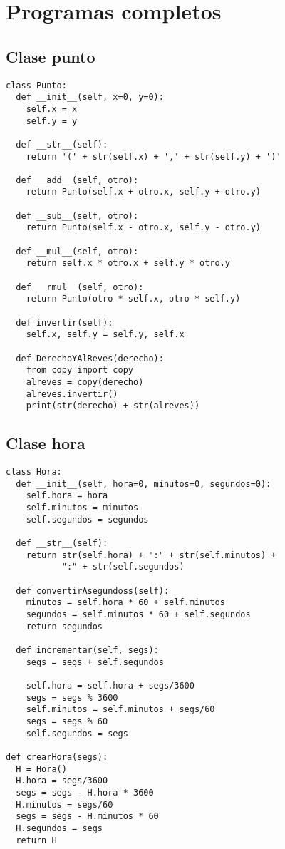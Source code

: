 
\chapter{Programas completos}

\section{Clase punto}

\begin{verbatim}
class Punto:
  def __init__(self, x=0, y=0):
    self.x = x
    self.y = y

  def __str__(self):
    return '(' + str(self.x) + ',' + str(self.y) + ')'

  def __add__(self, otro):
    return Punto(self.x + otro.x, self.y + otro.y)

  def __sub__(self, otro):
    return Punto(self.x - otro.x, self.y - otro.y)

  def __mul__(self, otro):
    return self.x * otro.x + self.y * otro.y

  def __rmul__(self, otro):
    return Punto(otro * self.x, otro * self.y)

  def invertir(self):
    self.x, self.y = self.y, self.x

  def DerechoYAlReves(derecho):
    from copy import copy
    alreves = copy(derecho)
    alreves.invertir()
    print(str(derecho) + str(alreves))
\end{verbatim}

\section{Clase hora}

\begin{verbatim}
class Hora:
  def __init__(self, hora=0, minutos=0, segundos=0):
    self.hora = hora
    self.minutos = minutos
    self.segundos = segundos

  def __str__(self):
    return str(self.hora) + ":" + str(self.minutos) + 
           ":" + str(self.segundos)

  def convertirAsegundoss(self):
    minutos = self.hora * 60 + self.minutos
    segundos = self.minutos * 60 + self.segundos
    return segundos

  def incrementar(self, segs):
    segs = segs + self.segundos

    self.hora = self.hora + segs/3600
    segs = segs % 3600
    self.minutos = self.minutos + segs/60
    segs = segs % 60
    self.segundos = segs

def crearHora(segs):
  H = Hora()
  H.hora = segs/3600
  segs = segs - H.hora * 3600
  H.minutos = segs/60
  segs = segs - H.minutos * 60
  H.segundos = segs
  return H
\end{verbatim}


